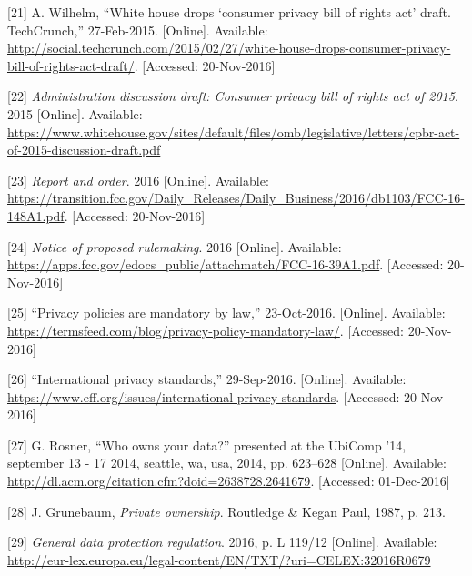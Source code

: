 \documentclass[12pt,english,a4paper,titlepage,cleardoublepage=empty,dottedtoc]{report}
\begin{document}
\hypertarget{ref-web_2015_white-house-releases-consumer-privacy-bill-draft}{}
{[}21{]} A. Wilhelm, ``White house drops `consumer privacy bill of
rights act' draft. TechCrunch,'' 27-Feb-2015. {[}Online{]}. Available:
\url{http://social.techcrunch.com/2015/02/27/white-house-drops-consumer-privacy-bill-of-rights-act-draft/}.
{[}Accessed: 20-Nov-2016{]}

\hypertarget{ref-bill-draft_2015_us_consumer-privacy-bill-of-rights-act_definition}{}
{[}22{]} \emph{Administration discussion draft: Consumer privacy bill of
rights act of 2015}. 2015 {[}Online{]}. Available:
\url{https://www.whitehouse.gov/sites/default/files/omb/legislative/letters/cpbr-act-of-2015-discussion-draft.pdf}

\hypertarget{ref-rules_2016_fcc_to-protect-broadband-consumer-privacy_sensitive-types-of-data}{}
{[}23{]} \emph{Report and order}. 2016 {[}Online{]}. Available:
\url{https://transition.fcc.gov/Daily_Releases/Daily_Business/2016/db1103/FCC-16-148A1.pdf}.
{[}Accessed: 20-Nov-2016{]}

\hypertarget{ref-rules_2016_fcc_to-protect-broadband-consumer-privacy_personally-identifiable-information}{}
{[}24{]} \emph{Notice of proposed rulemaking}. 2016 {[}Online{]}.
Available:
\url{https://apps.fcc.gov/edocs_public/attachmatch/FCC-16-39A1.pdf}.
{[}Accessed: 20-Nov-2016{]}

\hypertarget{ref-web_2016_privacy-policies-are-mandatory-by-law}{}
{[}25{]} ``Privacy policies are mandatory by law,'' 23-Oct-2016.
{[}Online{]}. Available:
\url{https://termsfeed.com/blog/privacy-policy-mandatory-law/}.
{[}Accessed: 20-Nov-2016{]}

\hypertarget{ref-web_2016_international-privacy-standards}{}
{[}26{]} ``International privacy standards,'' 29-Sep-2016. {[}Online{]}.
Available:
\url{https://www.eff.org/issues/international-privacy-standards}.
{[}Accessed: 20-Nov-2016{]}

\hypertarget{ref-paper_2014_who-owns-yours-data}{}
{[}27{]} G. Rosner, ``Who owns your data?'' presented at the UbiComp
'14, september 13 - 17 2014, seattle, wa, usa, 2014, pp. 623--628
{[}Online{]}. Available:
\url{http://dl.acm.org/citation.cfm?doid=2638728.2641679}. {[}Accessed:
01-Dec-2016{]}

\hypertarget{ref-book_1987_private-ownership_definition}{}
{[}28{]} J. Grunebaum, \emph{Private ownership}. Routledge \& Kegan
Paul, 1987, p. 213.

\hypertarget{ref-regulation_2016_eu_general-data-protection-regulation_ownership}{}
{[}29{]} \emph{General data protection regulation}. 2016, p. L 119/12
{[}Online{]}. Available:
\url{http://eur-lex.europa.eu/legal-content/EN/TXT/?uri=CELEX:32016R0679}
\end{document}
